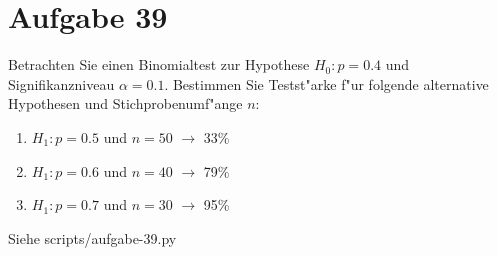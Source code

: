 \section{Aufgabe 39}

Betrachten Sie einen Binomialtest zur Hypothese $H_0 : p = 0.4$ und
Signifikanzniveau $\alpha = 0.1$. Bestimmen Sie Testst"arke f"ur folgende
alternative Hypothesen und Stichprobenumf"ange $n$:

\begin{enumerate}
    \item $H_1 : p = 0.5$ und $n = 50$
        $\rightarrow$ 33\%
    \item $H_1 : p = 0.6$ und $n = 40$
        $\rightarrow$ 79\%
    \item $H_1 : p = 0.7$ und $n = 30$
        $\rightarrow$ 95\%
\end{enumerate}

Siehe scripts/aufgabe-39.py
